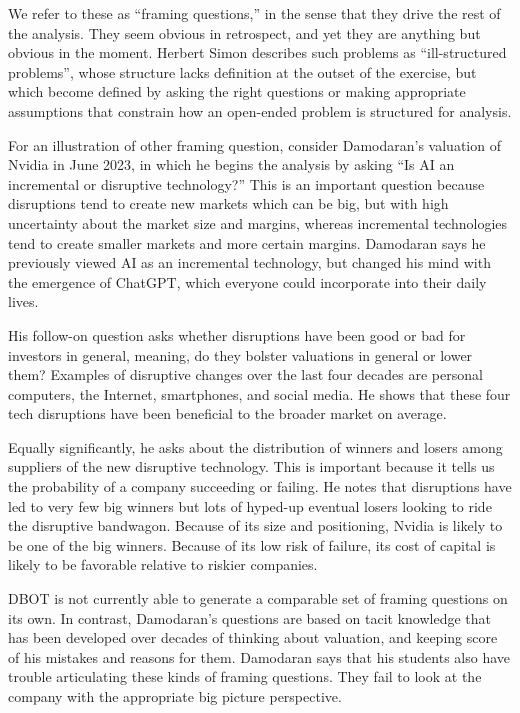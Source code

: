 \documentclass[]{interact}
\theoremstyle{plain}%
\theoremstyle{definition}
\theoremstyle{remark}
\begin{document}
We refer to these as “framing questions,” in the sense that they drive the rest of the analysis. They seem obvious in retrospect, and yet they are anything but obvious in the moment. Herbert Simon describes such problems as ``ill-structured problems''\cite{simon1973structure}, whose structure lacks definition at the outset of the exercise, but which become defined by asking the right questions or making appropriate assumptions that constrain how an open-ended problem is structured for analysis.

For an illustration of other framing question, consider Damodaran's valuation of Nvidia in June 2023, in which he begins the analysis by asking ``Is AI an incremental or disruptive technology?''  This is an important question because disruptions tend to create new markets which can be big, but with high uncertainty about the market size and margins, whereas incremental technologies tend to create smaller markets and more certain margins. Damodaran says he previously viewed AI as an incremental technology, but changed his mind with the emergence of ChatGPT, which everyone could incorporate into their daily lives.

His follow-on question asks whether disruptions have been good or bad for investors in general, meaning, do they bolster valuations in general or lower them? Examples of disruptive changes over the last four decades are personal computers, the Internet, smartphones, and social media. He shows that these four tech disruptions have been beneficial to the broader market on average. 

Equally significantly, he asks about the distribution of winners and losers among suppliers of the new disruptive technology. This is important because it tells us the probability of a company succeeding or failing. He notes that disruptions have led to very few big winners but lots of hyped-up eventual losers looking to ride the disruptive bandwagon. Because of its size and positioning, Nvidia is likely to be one of the big winners. Because of its low risk of failure, its cost of capital is likely to be favorable relative to riskier companies.

DBOT is not currently able to generate a comparable set of framing questions on its own. In contrast, Damodaran’s questions are based on tacit knowledge that has been developed over decades of thinking about valuation, and keeping score of his mistakes and reasons for them. Damodaran says that his students also have trouble articulating these kinds of framing questions. They fail to look at the company with the appropriate big picture perspective. 
\end{document}
